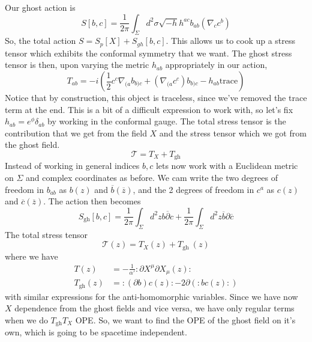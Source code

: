 \documentclass[11pt, oneside]{article}   	%
\theoremstyle{slanted}
\begin{document}
Our ghost action is 
\[
	S \left[  b, c  \right]   = \frac{1}{2 \pi } \int_{ \Sigma } d ^ 2 \sigma \sqrt{ - h }  h ^{ ac } b _{ ab } \left( 
	\nabla _ c c ^ b\right) 
\] So, the total action 
$ S = S _ p \left[  X  \right]  + S _{ gh } \left[  b, c \right]  $. 
This allows us to cook up a stress tensor 
which exhibits the conformal symmetry 
that we want. 
The ghost stress tensor is then, upon varying 
the metric $ h _{ ab } $ appropriately in 
our action, 
\[
	T_{ ab }  = - i \left( \frac{1}{2 } c ^ c \nabla _{ ( a  } b _{ b ) c  } 
	+ \left( \nabla _{ ( a  } c ^ c  \right) b _{ b ) c }    - h _{ ab } \text{trace}\right)  
	\] Notice that by
	construction, this object is traceless, 
	since we've removed the 
	trace term at the end.
	This is a bit of a difficult expression to work with, 
	so let's fix $ h _{ ab }  = e ^{ \phi } \delta _{ ab } $ 
	by working in the conformal gauge. 
The total stress tensor is the contribution that we 
get from the field $ X $ and the stress tensor which we got from the 
ghost field. 
\[
 \mathcal{ T }  = T _ X + T _{ \text{gh}}
\] Instead of working in 
general indices $ b , c $  lets 
now work with a Euclidean metric on 
$ \Sigma $ and complex coordinates as before. 
We cam write the two degrees of freedom 
in $ b _{ab } $ as $ b \left( z  \right)  $ and $ \overline{ b } \left( \overline{ z }  \right)  $, 
and the 2 degrees of freedom in $ c ^ a $ 
as $ c \left( z  \right)   $ and $ \overline{ c } \left(  \overline{ z }  \right)  $. 
The action then becomes 
\[
 S _{\text{gh}} \left[  b,  c  \right]   = \frac{1}{ 2 \pi } \int_{ \Sigma } d ^ 2 z 
 b \overline{ \partial  } c + \frac{1}{2 \pi } \int_{ \Sigma }  d ^ 2 z \overline{ b } \partial  \overline{ c } 
\] The total stress 
tensor 
\[
	\mathcal{ T } \left(  z  \right)  = T _ X \left(  z  \right)  + 
	T_{\text{gh } } \left( z  \right)  
\] where we have 
\begin{align*}
	T \left( z   \right)  & =  - \frac{1}{\alpha ' } : \partial   X^ \mu \partial  X _ \mu \left( z  \right)  : \\
	T _{\text{gh}}\left( z  \right)  &=  : \left( \partial  b  \right)  c \left( z  \right)  : 
	-  2 \partial  \left( : bc \left( z   \right)  :   \right) 
\end{align*}
with similar expressions for the anti-homomorphic variables. 
Since we have now $ X $ dependence from the ghost fields 
and vice versa, we have only regular terms 
when we do $ T _{\text{gh}} T_{ X } $ OPE. 
So, we want to find the OPE of the ghost field on it's own, 
which is going to be spacetime independent. 
 
\end{document}

